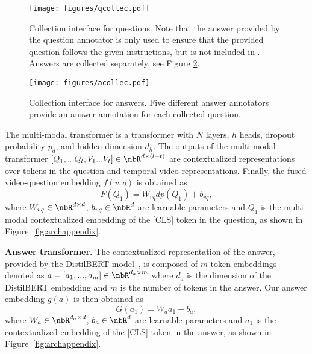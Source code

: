 \begin{figure*}[t]
\centering
\begin{subfigure}{0.95\textwidth}
\texttt{[image: figures/qcollec.pdf]}
\caption{Collection interface for questions. Note that the answer provided by the question annotator is only used to ensure that the provided question follows the given instructions, but is not included in \smalldatasetname{}. Answers are collected separately, see Figure \ref{fig:acollec}.}
\label{fig:qcollec}
\end{subfigure}
\begin{subfigure}{0.95\textwidth}
\texttt{[image: figures/acollec.pdf]}
\caption{Collection interface for answers. Five different answer annotators provide an answer annotation for each collected question.}
\label{fig:acollec}
\end{subfigure}
\vspace{-0.2cm}
\caption{Amazon Mechanical Turk interfaces for collecting questions (Figure \ref{fig:qcollec}) and answers (Figure \ref{fig:acollec}) for the \smalldatasetname{} dataset. For readability, the videos shown in these Figures are shrinked, and only one annotation example is shown.}
\vspace{-0.5cm}
\label{fig:collec}
\end{figure*}

The multi-modal transformer is a transformer with $N$ layers, $h$ heads, dropout probability $p_d$, and hidden dimension $d_h$. The outputs of the multi-modal transformer $[Q_1, ... Q_l, V_1 ... V_t] \in \nbR^{d \times (l+t)}$ are contextualized representations over tokens in the question and temporal video representations. Finally, the fused video-question embedding $f(v,q)$ is obtained as 
\begin{equation}
F(Q_1) = W_{vq} dp(Q_1) + b_{vq},
\end{equation}
where $W_{vq} \in \nbR^{d \times d}$, $b_{vq} \in \nbR^{d}$ are learnable parameters and $Q_1$ is the multi-modal contextualized embedding of the [CLS] token in the question, as shown in Figure~\ref{fig:archappendix}.

\noindent \textbf{Answer transformer.} The contextualized representation of the answer, provided by the DistilBERT model~\cite{sanh2019distilbert}, is composed of $m$ token embeddings denoted as $a = [a_1, ..., a_{m}] \in \nbR^{d_a \times m}$ where $d_a$ is the dimension of the DistilBERT embedding and $m$ is the number of tokens in the answer. 
Our answer embedding $g(a)$ is then obtained as
\begin{equation}
G(a_1) = W_a a_1 + b_a,
\end{equation}
where $W_{a} \in \nbR^{d_a \times d}$, $b_{a} \in \nbR^{d}$ are learnable parameters and $a_1$ is the contextualized embedding of the [CLS] token in the answer, as shown in Figure~\ref{fig:archappendix}.



